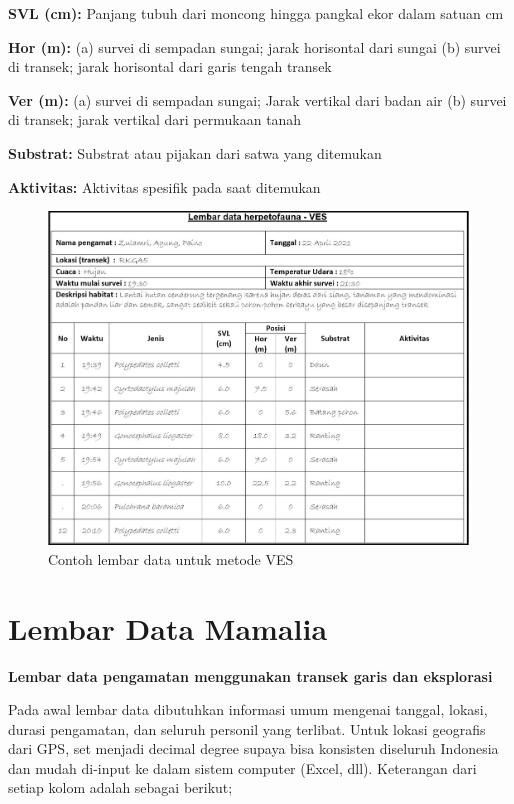 \documentclass[
]{book}
\begin{document}
\textbf{SVL (cm):} Panjang tubuh dari moncong hingga pangkal ekor dalam satuan cm

\textbf{Hor (m):} (a) survei di sempadan sungai; jarak horisontal dari sungai (b) survei di transek; jarak horisontal dari garis tengah transek

\textbf{Ver (m):} (a) survei di sempadan sungai; Jarak vertikal dari badan air (b) survei di transek; jarak vertikal dari permukaan tanah

\textbf{Substrat:} Substrat atau pijakan dari satwa yang ditemukan

\textbf{Aktivitas:} Aktivitas spesifik pada saat ditemukan

\begin{figure}

{\centering \includegraphics[width=1\linewidth]{images/ldh_ves} 

}

\caption{Contoh lembar data untuk metode VES}\label{fig:ldhves}
\end{figure}

\hypertarget{lembar-data-mamalia}{%
\section*{Lembar Data Mamalia}\label{lembar-data-mamalia}}

\textbf{Lembar data pengamatan menggunakan transek garis dan eksplorasi}

Pada awal lembar data dibutuhkan informasi umum mengenai tanggal, lokasi, durasi pengamatan, dan seluruh personil yang terlibat. Untuk lokasi geografis dari GPS, set menjadi decimal degree supaya bisa konsisten diseluruh Indonesia dan mudah di-input ke dalam sistem computer (Excel, dll). Keterangan dari setiap kolom adalah sebagai berikut;
\end{document}
